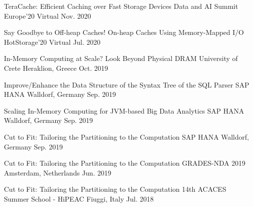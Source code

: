 

\begin{cvhonors}
  \cvhonor
    {TeraCache: Efficient Caching over Fast Storage Devices} %
    {Data and AI Summit Europe'20} %
    {Virtual} %
    {Nov. 2020} %

  \cvhonor
    {Say Goodbye to Off-heap Caches! On-heap Caches Using Memory-Mapped I/O} %
    {HotStorage'20} %
    {Virtual} %
    {Jul. 2020} %

  \cvhonor
    {In-Memory Computing at Scale? Look Beyond Physical DRAM} %
    {University of Crete} %
    {Heraklion, Greece} %
    {Oct. 2019} %

  \cvhonor
    {Improve/Enhance the Data Structure of the Syntax Tree of the SQL Parser} %
    {SAP HANA} %
    {Walldorf, Germany} %
    {Sep. 2019} %


  \cvhonor
    {Scaling In-Memory Computing for JVM-based Big Data Analytics} %
    {SAP HANA} %
    {Walldorf, Germany} %
    {Sep. 2019} %

  \cvhonor
    {Cut to Fit: Tailoring the Partitioning to the Computation} %
    {SAP HANA} %
    {Walldorf, Germany} %
    {Sep. 2019} %

  \cvhonor
    {Cut to Fit: Tailoring the Partitioning to the Computation} %
    {GRADES-NDA 2019} %
    {Amsterdam, Netherlands} %
    {Jun. 2019} %

  \cvhonor
    {Cut to Fit: Tailoring the Partitioning to the Computation} %
    {14th ACACES Summer School - HiPEAC} %
    {Fiuggi, Italy} %
    {Jul. 2018} %

\end{cvhonors}
